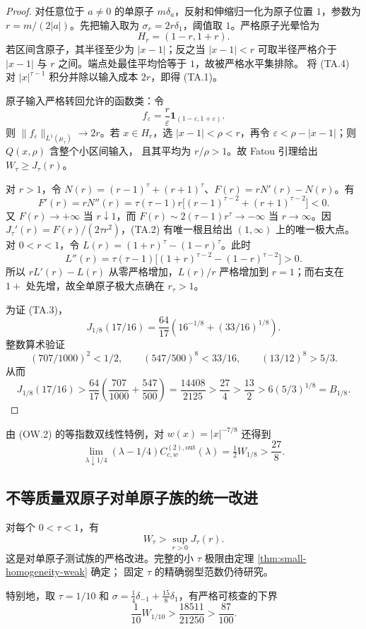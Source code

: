 \begin{proof}
对任意位于 $a\ne0$ 的单原子 $m\delta_a$，反射和伸缩归一化为原子位置 $1$，参数为 $r=m/(2|a|)$。先把输入取为 $\sigma_r=2r\delta_1$，阈值取 $1$。严格原子光晕恰为
\[
 H_r=(1-r,1+r). \tag{TA.4}
\]
若区间含原子，其半径至少为 $|x-1|$；反之当 $|x-1|<r$ 可取半径严格介于
$|x-1|$ 与 $r$ 之间。端点处最佳平均恰等于 $1$，故被严格水平集排除。
将 (TA.4) 对 $|x|^{\tau-1}$ 积分并除以输入成本 $2r$，即得 (TA.1)。

原子输入严格转回允许的函数类：令
\[
 f_\varepsilon=\frac r\varepsilon\mathbf1_{(1-\varepsilon,1+\varepsilon)}.
\]
则 $\|f_\varepsilon\|_{L^1(\mu_\tau)}\to2r$。若 $x\in H_r$，选
$|x-1|<\rho<r$，再令 $\varepsilon<\rho-|x-1|$；则 $Q(x,\rho)$ 含整个小区间输入，
且其平均为 $r/\rho>1$。故 Fatou 引理给出 $W_\tau\ge J_\tau(r)$。

对 $r>1$，令 $N(r)=(r-1)^\tau+(r+1)^\tau$、$F(r)=rN'(r)-N(r)$。有
\[
 F'(r)=rN''(r)=\tau(\tau-1)r\bigl[(r-1)^{\tau-2}+(r+1)^{\tau-2}\bigr]<0.
\]
又 $F(r)\to+\infty$ 当 $r\downarrow1$，而
\(F(r)\sim2(\tau-1)r^\tau\to-\infty\) 当 $r\to\infty$。因
$J_\tau'(r)=F(r)/(2\tau r^2)$，(TA.2) 有唯一根且给出 $(1,\infty)$ 上的唯一极大点。
对 $0<r<1$，令 $L(r)=(1+r)^\tau-(1-r)^\tau$。此时
\[
 L''(r)=\tau(\tau-1)\bigl[(1+r)^{\tau-2}-(1-r)^{\tau-2}\bigr]>0.
\]
所以 $rL'(r)-L(r)$ 从零严格增加，$L(r)/r$ 严格增加到 $r=1$；而右支在
$1+$ 处先增，故全单原子极大点确在 $r_\tau>1$。

为证 (TA.3)，
\[
 J_{1/8}(17/16)=\frac{64}{17}\left(16^{-1/8}+(33/16)^{1/8}\right).
\]
整数算术验证
\[
 (707/1000)^2<1/2,\qquad (547/500)^8<33/16,\qquad (13/12)^8>5/3.
\]
从而
\[
 J_{1/8}(17/16)>\frac{64}{17}
 \left(\frac{707}{1000}+\frac{547}{500}\right)
 =\frac{14408}{2125}>\frac{27}{4}>\frac{13}{2}
 >6(5/3)^{1/8}=B_{1/8}.
\]
\end{proof}

由 (OW.2) 的等指数双线性特例，对 $w(x)=|x|^{-7/8}$ 还得到
\[
 \lim_{\lambda\downarrow1/4}(\lambda-1/4)
 C^{(2),\mathrm{out}}_{c,w}(\lambda)
 =\tfrac12W_{1/8}>\frac{27}{8}. \tag{TA.5}
\]

\subsection{不等质量双原子对单原子族的统一改进}

\begin{theorem}[统一的双原子改进]
\label{thm:uniform-two-atom-improvement}
对每个 $0<\tau<1$，有
\[
 W_\tau>\sup_{r>0}J_\tau(r). \tag{TB.1}
\]
这是对单原子测试族的严格改进。完整的小 $\tau$ 极限由定理 \ref{thm:small-homogeneity-weak} 确定；
固定 $\tau$ 的精确弱型范数仍待研究。

特别地，取 \(\tau=1/10\) 和
\(\sigma=\frac14\delta_{-1}+\frac{15}{8}\delta_1\)，有严格可核查的下界
\[
 \frac1{10}W_{1/10}>\frac{18511}{21250}>\frac{87}{100}. \tag{TB.2}
\]
\end{theorem}

